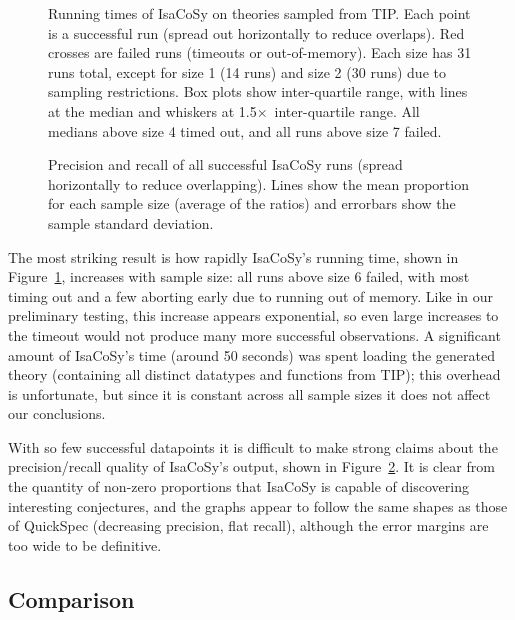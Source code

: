 \begin{figure}
  \centering
  
  \caption{Running times of IsaCoSy on theories sampled from TIP. Each point
    is a successful run (spread out horizontally to reduce overlaps). Red
    crosses are failed runs (timeouts or out-of-memory). Each size has 31 runs
    total, except for size 1 (14 runs) and size 2 (30 runs) due to sampling
    restrictions. Box plots show inter-quartile range, with lines at the median
    and whiskers at 1.5$\times$~inter-quartile range. All medians above size 4
    timed out, and all runs above size 7 failed.}
  \label{figure:isacosy_runtimes}
\end{figure}

\begin{figure}
  \centering
  
  \caption{Precision and recall of all successful IsaCoSy runs (spread
    horizontally to reduce overlapping). Lines show the mean proportion for each
    sample size (average of the ratios) and errorbars show the sample standard
    deviation.}
  \label{figure:isacosy_precRec}
\end{figure}

The most striking result is how rapidly IsaCoSy's running time, shown in
Figure~\ref{figure:isacosy_runtimes}, increases with sample size: all runs above
size 6 failed, with most timing out and a few aborting early due to running out
of memory. Like in our preliminary testing, this increase appears exponential,
so even large increases to the timeout would not produce many more successful
observations. A significant amount of IsaCoSy's time (around 50 seconds) was
spent loading the generated theory (containing all distinct datatypes and
functions from TIP); this overhead is unfortunate, but since it is constant
across all sample sizes it does not affect our conclusions.

With so few successful datapoints it is difficult to make strong claims about
the precision/recall quality of IsaCoSy's output, shown in
Figure~\ref{figure:isacosy_precRec}. It is clear from the quantity of non-zero
proportions that IsaCoSy is capable of discovering interesting conjectures, and
the graphs appear to follow the same shapes as those of QuickSpec (decreasing
precision, flat recall), although the error margins are too wide to be
definitive.

\subsection{Comparison}

